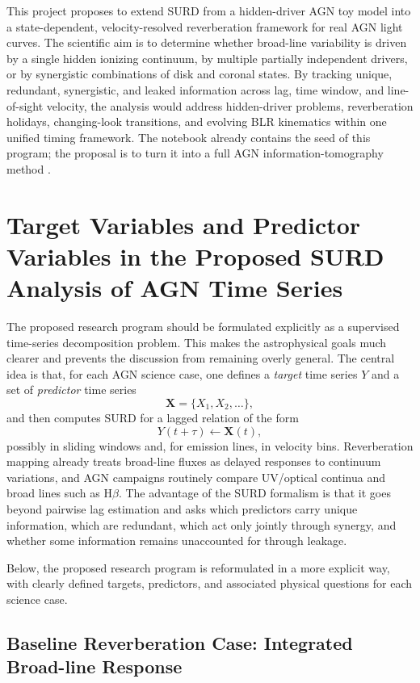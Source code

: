 \documentclass{article}
\begin{document}
This project proposes to extend SURD from a hidden-driver AGN toy model into a state-dependent, velocity-resolved reverberation framework for real AGN light curves. The scientific aim is to determine whether broad-line variability is driven by a single hidden ionizing continuum, by multiple partially independent drivers, or by synergistic combinations of disk and coronal states. By tracking unique, redundant, synergistic, and leaked information across lag, time window, and line-of-sight velocity, the analysis would address hidden-driver problems, reverberation holidays, changing-look transitions, and evolving BLR kinematics within one unified timing framework. The notebook already contains the seed of this program; the proposal is to turn it into a full AGN information-tomography method \cite{AGN_SURD_notebook}.



\section{Target Variables and Predictor Variables in the Proposed SURD Analysis of AGN Time Series}
\label{sec:targets_predictors_surd_agn}

The proposed research program should be formulated explicitly as a supervised time-series decomposition problem. This makes the astrophysical goals much clearer and prevents the discussion from remaining overly general. The central idea is that, for each AGN science case, one defines a \emph{target} time series \(Y\) and a set of \emph{predictor} time series
\[
\mathbf{X}=\{X_1,X_2,\dots\},
\]
and then computes SURD for a lagged relation of the form
\[
Y(t+\tau)\leftarrow \mathbf{X}(t),
\]
possibly in sliding windows and, for emission lines, in velocity bins. Reverberation mapping already treats broad-line fluxes as delayed responses to continuum variations, and AGN campaigns routinely compare UV/optical continua and broad lines such as H$\beta$. The advantage of the SURD formalism is that it goes beyond pairwise lag estimation and asks which predictors carry unique information, which are redundant, which act only jointly through synergy, and whether some information remains unaccounted for through leakage.

Below, the proposed research program is reformulated in a more explicit way, with clearly defined targets, predictors, and associated physical questions for each science case.

\subsection{Baseline Reverberation Case: Integrated Broad-line Response}
\end{document}
